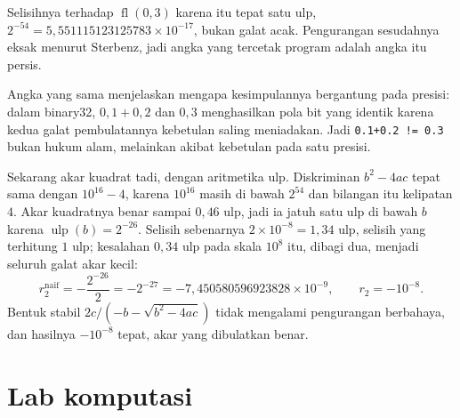 Selisihnya terhadap $\operatorname{fl}(0{,}3)$ karena itu tepat satu ulp,
$2^{-54}=5{,}551115123125783\times10^{-17}$, bukan galat acak. Pengurangan sesudahnya
eksak menurut Sterbenz, jadi angka yang tercetak program adalah angka itu persis.

Angka yang sama menjelaskan mengapa kesimpulannya bergantung pada presisi: dalam
binary32, $0{,}1+0{,}2$ dan $0{,}3$ menghasilkan pola bit yang identik karena kedua
galat pembulatannya kebetulan saling meniadakan. Jadi \texttt{0.1+0.2 != 0.3} bukan
hukum alam, melainkan akibat kebetulan pada satu presisi.

Sekarang akar kuadrat tadi, dengan aritmetika ulp. Diskriminan $b^{2}-4ac$ tepat
sama dengan $10^{16}-4$, karena $10^{16}$ masih di bawah $2^{54}$ dan bilangan itu
kelipatan $4$. Akar kuadratnya benar sampai $0{,}46$ ulp, jadi ia jatuh satu ulp di
bawah $b$ karena $\operatorname{ulp}(b)=2^{-26}$. Selisih sebenarnya $2\times10^{-8}=1{,}34$ ulp,
selisih yang terhitung $1$ ulp; kesalahan $0{,}34$ ulp pada skala $10^{8}$ itu, dibagi
dua, menjadi seluruh galat akar kecil:
\[
  r_{2}^{\text{naif}}=-\frac{2^{-26}}{2}=-2^{-27}
  =-7{,}450580596923828\times10^{-9},
  \qquad r_{2}=-10^{-8}.
\]
Bentuk stabil $2c/(-b-\sqrt{b^{2}-4ac})$ tidak mengalami pengurangan berbahaya, dan
hasilnya $-10^{-8}$ tepat, akar yang dibulatkan benar.

\section{Lab komputasi}


